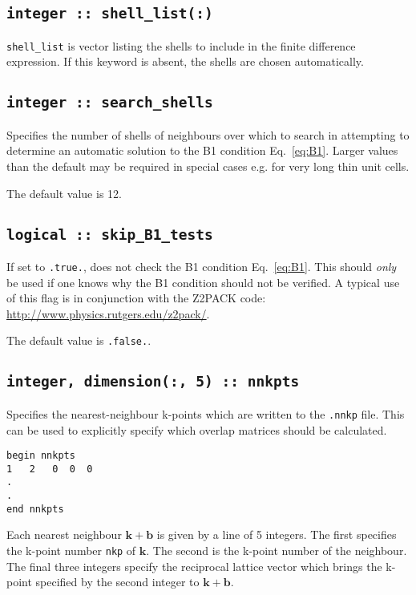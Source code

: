 \subsection[shell\_list]{\tt integer :: shell\_list(:)}

\verb#shell_list# is vector listing the shells
to include in the finite difference expression. If this keyword is
absent, the shells are chosen automatically.

\subsection[search\_shells]{\tt integer :: search\_shells}

Specifies the number of shells of neighbours over which to search in
attempting to determine an automatic solution to the B1 condition
Eq.~\ref{eq:B1}. Larger values than the default may be required in special
cases e.g. for very long thin unit cells.

The default value is 12.

\subsection[skip\_B1\_tests]{\tt logical :: skip\_B1\_tests}

If set to \texttt{.true.}, does not check the B1 condition
Eq.~\ref{eq:B1}. This should \emph{only} be used if one knows
why the B1 condition should not be verified. A typical use of this
flag is in conjunction with the Z2PACK code:
\url{http://www.physics.rutgers.edu/z2pack/}.

The default value is \texttt{.false.}.

\subsection[nnkpts]{\tt integer, dimension(:, 5) :: nnkpts}

Specifies the nearest-neighbour k-points which are written to the \texttt{.nnkp} file. This can be used to explicitly specify which overlap matrices should be calculated.

\begin{verbatim}
begin nnkpts
1   2   0  0  0
.
.
end nnkpts
\end{verbatim}

Each nearest neighbour $\mathbf{k + b}$ is given by a line of 5 integers. The first specifies the k-point number \texttt{nkp} of $\mathbf{k}$. The second is the k-point number of the neighbour. The final three integers specify the reciprocal lattice vector which brings the k-point specified by the second integer to $\mathbf{k + b}$.

